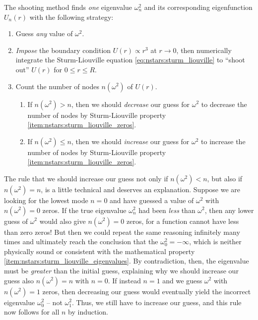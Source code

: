 The shooting method finds \emph{one} eigenvalue $\omega_n^2$ and its corresponding eigenfunction $U_n(r)$ with the following strategy:
\begin{enumerate}
\item Guess \emph{any} value of $\omega^2$.
\item \emph{Impose} the boundary condition $U(r) \propto r^3$ at $r \rightarrow 0$, then numerically integrate the Sturm-Liouville equation \eqref{eq:nstars:sturm_liouville} to ``shoot out'' $U(r)$ for $0 \leq r \leq R$.
\item Count the number of nodes $n(\omega^2)$ of $U(r)$.
      \begin{enumerate}
      \item If $n(\omega^2) > n$, then we should \emph{decrease} our guess for $\omega^2$ to decrease the number of nodes by Sturm-Liouville property \ref{item:nstars:sturm_liouville_zeros}.
      \item If $n(\omega^2) \leq n$, then we should \emph{increase} our guess for $\omega^2$ to increase the number of nodes by Sturm-Liouville property \ref{item:nstars:sturm_liouville_zeros}.
      \end{enumerate}
\end{enumerate}
The rule that we should increase our guess not only if $n(\omega^2) < n$, but also if $n(\omega^2) = n$, is a little technical and deserves an explanation.
Suppose we are looking for the lowest mode $n = 0$ and have guessed a value of $\omega^2$ with $n(\omega^2) = 0$ zeros.
If the true eigenvalue $\omega_n^2$ had been \emph{less} than $\omega^2$, then any lower guess of $\omega^2$ would also give $n(\omega^2) = 0$ zeros, for a function cannot have less than zero zeros!
But then we could repeat the same reasoning infinitely many times and ultimately reach the conclusion that the $\omega_0^2 = -\infty$, which is neither physically sound or consistent with the mathematical property \ref{item:nstars:sturm_liouville_eigenvalues}.
By contradiction, then, the eigenvalue must be \emph{greater} than the initial guess, explaining why we should increase our guess also $n(\omega^2) = n$ with $n = 0$.
If instead $n = 1$ and we guess $\omega^2$ with $n(\omega^2) = 1$ zeros, then decreasing our guess would eventually yield the incorrect eigenvalue $\omega_0^2$ -- not $\omega_1^2$.
Thus, we still have to increase our guess, and this rule now follows for all $n$ by induction.

